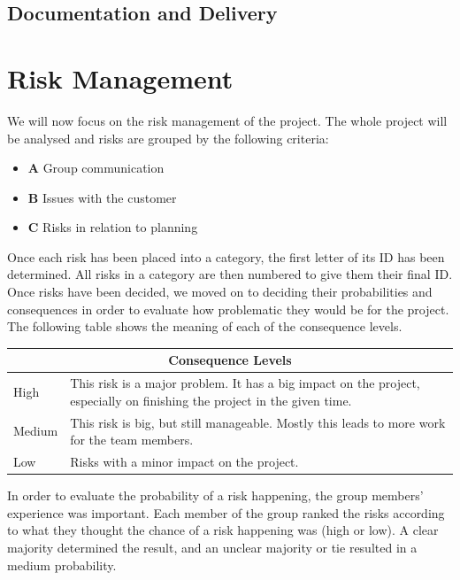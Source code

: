 \subsection{Documentation and Delivery}
\label{subsec:IntroProjPhasesDocDel}

\section{Risk Management}
\label{sec:IntroRiskMan}
We will now focus on the risk management of the project. The whole project will be analysed and risks are grouped by the following criteria:
\begin{itemize}
\item \textbf{A} Group communication
\item \textbf{B} Issues with the customer
\item \textbf{C} Risks in relation to planning
\end{itemize}
Once each risk has been placed into a category, the first letter of its ID has been determined. All risks in a category are then numbered to give them their final ID. Once risks have been decided, we moved on to deciding their probabilities and consequences in order to evaluate how problematic they would be for the project. The following table shows the meaning of each of the consequence levels.

\begin{minipage}{\linewidth}
\setlength{\tabcolsep}{10pt}
\centering
{}
\begin{tabular}{ |l|p{5cm}| }
	\hline
	\multicolumn{2}{|c|}{\cellcolor{gray!25} Consequence Levels} \\
	\hline
	High & This risk is a major problem. It has a big impact on the project, especially on finishing the project in the given time.\\
	Medium & This risk is big, but still manageable. Mostly this leads to more work for the team members. \\
	Low & Risks with a minor impact on the project. \\
	\hline
\end{tabular}
\end{minipage}

In order to evaluate the probability of a risk happening, the group members' experience was important. Each member of the group ranked the risks according to what they thought the chance of a risk happening was (high or low). A clear majority determined the result, and an unclear majority or tie resulted in a medium probability.


